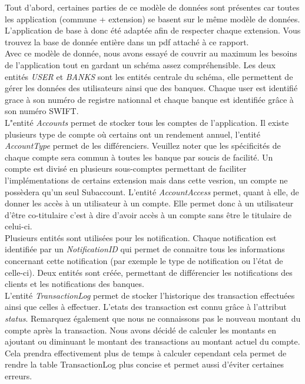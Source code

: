 Tout d'abord, certaines parties de ce modèle de données sont présentes car toutes les application (commune + extension) se basent sur le même modèle de données. L'application de base à donc été
adaptée afin de respecter chaque extension. Vous trouvez la base de donnée entière dans un pdf attaché à ce rapport.\\

Avec ce modèle de donnée, nous avons essayé de couvrir au maximum les besoins de l'application tout en gardant un schéma assez compréhensible.
Les deux entités \textit{USER} et \textit{BANKS} sont les entités centrale du schéma, elle permettent de gérer les données des utilisateurs ainsi que des banques.
Chaque user est identifié grace à son numéro de registre nationnal et chaque banque est identifiée grâce à son numéro SWIFT.\\
L"entité \textit{Accounts} permet de stocker tous les comptes de l'application. Il existe plusieurs type de compte où certains ont un rendement annuel, l'entité \textit{AccountType} permet de les différenciers.
Veuillez noter que les spécificités de chaque compte sera commun à toutes les banque par soucis de facilité.
Un compte est divisé en plusieurs sous-comptes permettant de faciliter l'implémentations de certains extension mais dans cette vesrion, un compte ne possèdera qu'un seul Subaccount.
L'entité \textit{AccountAccess} permet, quant à elle, de donner les accès à un utilisateur à un compte. Elle permet donc à un utilisateur d'être co-titulaire c'est à dire d'avoir accès à un compte sans être le titulaire de celui-ci.\\
Plusieurs entités sont utilisées pour les notification. Chaque notification est identifiée par un \textit{NotificationID} 
qui permet de connaitre tous les informations concernant cette notification (par exemple le type de notification ou l'état de celle-ci).
Deux entités sont créée, permettant de différencier les notifications des clients et les notifications des banques.\\
L'entité \textit{TransactionLog} permet de stocker l'historique des transaction effectuées ainsi que celles à effectuer. L'etats des transaction est connu grâce à l'attribut \textit{status}.
Remarquez également que nous ne connaissons pas le nouveau montant du compte après la transaction. Nous avons décidé de calculer les montants en ajoutant ou diminuant le montant des transactions au montant actuel du compte.
Cela prendra effectivement plus de temps à calculer cependant cela permet de rendre la table TransactionLog plus concise et permet aussi d'éviter certaines erreurs.
